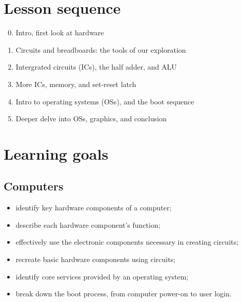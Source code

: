 \documentclass[11pt]{article}
\begin{document}
\vfill
\section*{Lesson sequence}

\begin{enumerate}
    \setcounter{enumi}{-1}
  \item Intro, first look at hardware
  \item Circuits and breadboards: the tools of our exploration
  \item Intergrated circuits (ICs), the half adder, and ALU
  \item More ICs, memory, and set-reset latch
  \item Intro to operating systems (OSs), and the boot sequence
  \item Deeper delve into OSs, graphics, and conclusion
\end{enumerate}

\section*{Learning goals}

\subsection*{Computers}

\begin{itemize}
  \item identify key hardware components of a computer;
  \item describe each hardware component's function;
  \item effectively use the electronic components necessary in creating circuits;
  \item recreate basic hardware components using circuits;
  \item identify core services provided by an operating system;
  \item break down the boot process, from computer power-on to user login.
\end{itemize}
\end{document}
